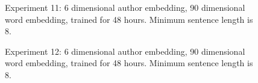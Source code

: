 \documentclass{article}%
\begin{document}
\begin{figure}
\noindent{}
\caption{Experiment 11: 6 dimensional author embedding, 90 dimensional word embedding, trained for 48 hours. Minimum sentence length is 8.}
\end{figure}
\begin{figure}
\noindent{}
\caption{Experiment 12: 6 dimensional author embedding, 90 dimensional word embedding, trained for 48 hours. Minimum sentence length is 8.}
\end{figure}
\end{document}
